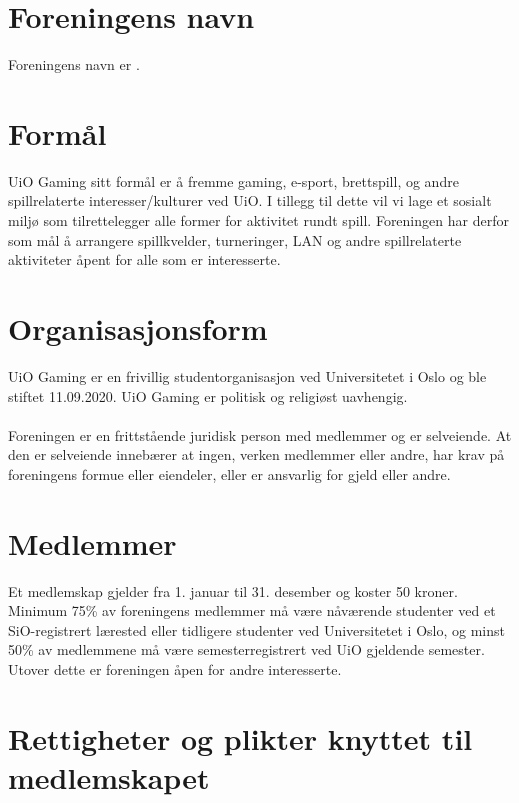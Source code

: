 \documentclass[12pt,a4paper,norsk]{article}
\begin{document}
\section{Foreningens navn}
Foreningens navn er .


\section{Formål}

UiO Gaming sitt formål er å fremme gaming, e-sport, brettspill, og andre spillrelaterte
interesser/kulturer ved UiO. I tillegg til dette vil vi lage et sosialt miljø som tilrettelegger alle
former for aktivitet rundt spill. Foreningen har derfor som mål å arrangere spillkvelder,
turneringer, LAN og andre spillrelaterte aktiviteter åpent for alle som er interesserte.



\section{Organisasjonsform}

UiO Gaming er en frivillig studentorganisasjon ved Universitetet i Oslo og ble stiftet
11.09.2020. UiO Gaming er politisk og religiøst uavhengig.
\\
\\
Foreningen er en frittstående juridisk person med medlemmer og er selveiende. At den er
selveiende innebærer at ingen, verken medlemmer eller andre, har krav på foreningens formue
eller eiendeler, eller er ansvarlig for gjeld eller andre.



\section{Medlemmer}

Et medlemskap gjelder fra 1. januar til 31. desember og koster 50 kroner. Minimum 75\% av
foreningens medlemmer må være nåværende studenter ved et SiO-registrert lærested eller
tidligere studenter ved Universitetet i Oslo, og minst 50\% av medlemmene må være
semesterregistrert ved UiO gjeldende semester. Utover dette er foreningen åpen for andre
interesserte.



\section{Rettigheter og plikter knyttet til medlemskapet}
\end{document}
